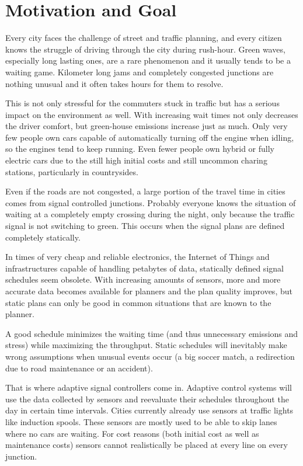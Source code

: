 \section{Motivation and Goal}

Every city faces the challenge of street and traffic planning, and every citizen knows the struggle of driving through the city during rush-hour. Green waves, especially long lasting ones, are a rare phenomenon and it usually tends to be a waiting game. Kilometer long jams and completely congested junctions are nothing unusual and it often takes hours for them to resolve.

This is not only stressful for the commuters stuck in traffic but has a serious impact on the environment as well.
With increasing wait times not only decreases the driver comfort, but green-house emissions increase just as much. Only very few people own cars capable of automatically turning off the engine when idling, so the engines tend to keep running. Even fewer people own hybrid or fully electric cars due to the still high initial costs and still uncommon charing stations, particularly in countrysides.

Even if the roads are not congested, a large portion of the travel time in cities comes from signal controlled junctions. Probably everyone knows the situation of waiting at a completely empty crossing during the night, only because the traffic signal is not switching to green.
This occurs when the signal plans are defined completely statically.

In times of very cheap and reliable electronics, the Internet of Things and infrastructures capable of handling petabytes of data, statically defined signal schedules seem obsolete.
With increasing amounts of sensors, more and more accurate data becomes available for planners and the plan quality improves, but static plans can only be good in common situations that are known to the planner.

A good schedule minimizes the waiting time (and thus unnecessary emissions and stress) while maximizing the throughput. Static schedules will inevitably make wrong assumptions when unusual events occur (a big soccer match, a redirection due to road maintenance or an accident).

That is where adaptive signal controllers come in. Adaptive control systems will use the data collected by sensors and reevaluate their schedules throughout the day in certain time intervals.
Cities currently already use sensors at traffic lights like induction spools.
These sensors are mostly used to be able to skip lanes where no cars are waiting. For cost reasons (both initial cost as well as maintenance costs) sensors cannot realistically be placed at every line on every junction.


